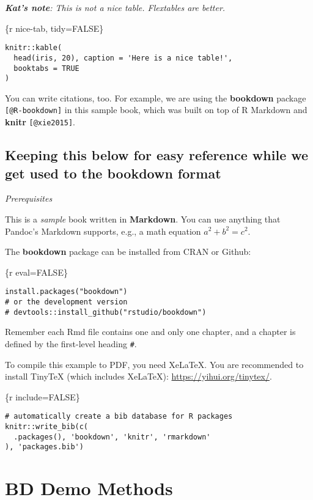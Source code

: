 \documentclass[
]{book}
\begin{document}
\emph{\textbf{Kat's note}: This is not a nice table. Flextables are better.}

\{r nice-tab, tidy=FALSE\}

\begin{verbatim}
knitr::kable(
  head(iris, 20), caption = 'Here is a nice table!',
  booktabs = TRUE
)
\end{verbatim}

You can write citations, too. For example, we are using the \textbf{bookdown} package \texttt{{[}@R-bookdown{]}} in this sample book, which was built on top of R Markdown and \textbf{knitr} \texttt{{[}@xie2015{]}}.

\section{Keeping this below for easy reference while we get used to the bookdown format}\label{keeping-this-below-for-easy-reference-while-we-get-used-to-the-bookdown-format}

\emph{Prerequisites}

This is a \emph{sample} book written in \textbf{Markdown}. You can use anything that Pandoc's Markdown supports, e.g., a math equation \(a^2 + b^2 = c^2\).

The \textbf{bookdown} package can be installed from CRAN or Github:

\{r eval=FALSE\}

\begin{verbatim}
install.packages("bookdown")
# or the development version
# devtools::install_github("rstudio/bookdown")
\end{verbatim}

Remember each Rmd file contains one and only one chapter, and a chapter is defined by the first-level heading \texttt{\#}.

To compile this example to PDF, you need XeLaTeX. You are recommended to install TinyTeX (which includes XeLaTeX): \url{https://yihui.org/tinytex/}.

\{r include=FALSE\}

\begin{verbatim}
# automatically create a bib database for R packages
knitr::write_bib(c(
  .packages(), 'bookdown', 'knitr', 'rmarkdown'
), 'packages.bib')
\end{verbatim}

\chapter{BD Demo Methods}\label{bd-demo-methods}
\end{document}
